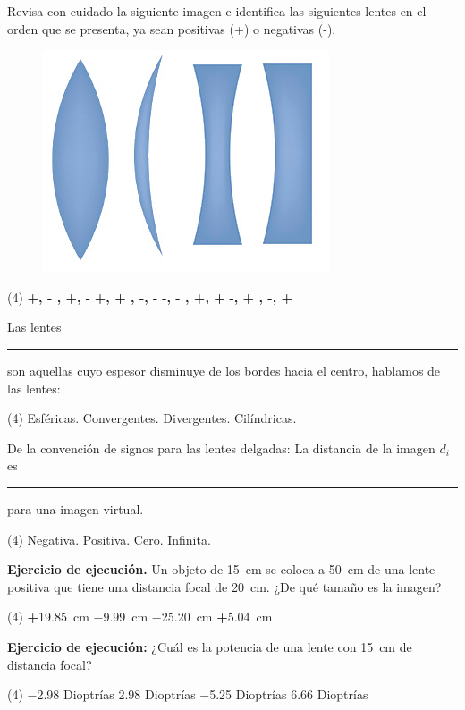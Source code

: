 \documentclass[12pt, letter]{exam}
\begin{document}
\begin{questions}
    \question Revisa con cuidado la siguiente imagen e identifica las siguientes lentes en el orden que se presenta, ya sean positivas (+) o negativas (-).
    \begin{figure}[H]
        \centering
        \includegraphics[scale=2]{Imagenes/Arreglo_Lentes_02.png}
    \end{figure}
    \begin{tasks}(4)
        \task \textbf{+, - , +, -}
        \task \textbf{+, + , -, -} 
        \task \textbf{-, - , +, +} 
        \task \textbf{-, + , -, +} 
    \end{tasks}
    \question Las lentes \rule{2.5cm}{0.1mm} son aquellas cuyo espesor disminuye de los bordes hacia el centro, hablamos de las lentes:
    \begin{tasks}(4)
        \task Esféricas.
        \task Convergentes.
        \task Divergentes.
        \task Cilíndricas.
    \end{tasks}
    \question De la convención de signos para las lentes delgadas:  La distancia de la imagen $d_{i}$ es \rule{2cm}{0.1mm} para una imagen virtual.
    \begin{tasks}(4)
        \task Negativa.
        \task Positiva.
        \task Cero.
        \task Infinita.
    \end{tasks}
    \question \label{Ejercicio_07} \textbf{Ejercicio de ejecución. } Un objeto de \SI{15}{\centi\meter} se coloca a \SI{50}{\centi\meter} de una lente positiva que tiene una distancia focal de \SI{20}{\centi\meter}. ¿De qué tamaño es la imagen?

    \vspace{0.3cm}
    \begin{tasks}(4)
        \task \textbf{+}\SI{19.85}{\centi\meter}
        \task \SI{-9.99}{\centi\meter}
        \task \SI{-25.20}{\centi\meter}
        \task \textbf{+}\SI{5.04}{\centi\meter}
    \end{tasks}
    \question \label{Ejercicio_08} \textbf{Ejercicio de ejecución: } ¿Cuál es la potencia de una lente con \SI{15}{\centi\meter} de distancia focal?
    \begin{tasks}(4)
        \task \num{-2.98} Dioptrías
        \task \num{2.98} Dioptrías
        \task \num{-5.25} Dioptrías
        \task \num{6.66} Dioptrías
    \end{tasks}


\end{questions}
\end{document}
